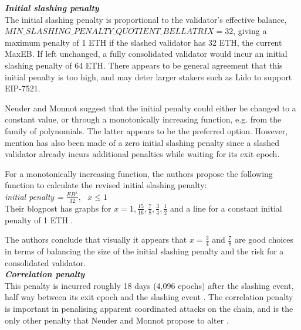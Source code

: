 \noindent
\textbf{\textit{Initial slashing penalty}} \\
The initial slashing penalty is proportional to the validator's effective balance, $MIN\_SLASHING\_PENALTY\_QUOTIENT\_BELLATRIX=32$, giving a maximum penalty of 1 ETH if the slashed validator has 32 ETH, the current MaxEB.
If left unchanged, a fully consolidated validator would incur an initial slashing penalty of 64 ETH. There appears to be general agreement that this initial penalty is too high, and may deter larger stakers such as Lido to support EIP-7521.

Neuder and Monnot suggest that the initial penalty could either be changed to a constant value, or through a monotonically increasing function, e.g.  from the family of polynomials. The latter appears to be the preferred option. However, mention has also been made of a zero initial slashing penalty since a slashed validator already incurs additional penalties while waiting for its exit epoch. 

For a monotonically increasing function, the authors propose the following function to calculate the revised initial slashing penalty:\\
\textit{initial penalty =} $\frac{EB^x}{32}, \texttt{ } x \leqslant 1$ \\

Their blogpost has graphs for $x=1, \frac{15}{16}, \frac{7}{8}, \frac{3}{4}, \frac{1}{2}$ and a line for a constant initial penalty of 1 ETH \cite{Neuder2023d}.

The authors conclude that visually it appears that $x = \frac{3}{4}$ and $\frac{7}{8}$ are good choices in terms of balancing the size of the initial slashing penalty and the risk for a consolidated validator.\\

\noindent
\textbf{\textit{Correlation penalty}} \\
This penalty is incurred roughly 18 days (4,096 epochs) after the slashing event, half way between its exit epoch and the slashing event \cite{Edgington2023}. The correlation penalty is important in penalising apparent coordinated attacks on the chain, and is the only other penalty that Neuder and Monnot propose to alter \cite{Neuder2023d}.

